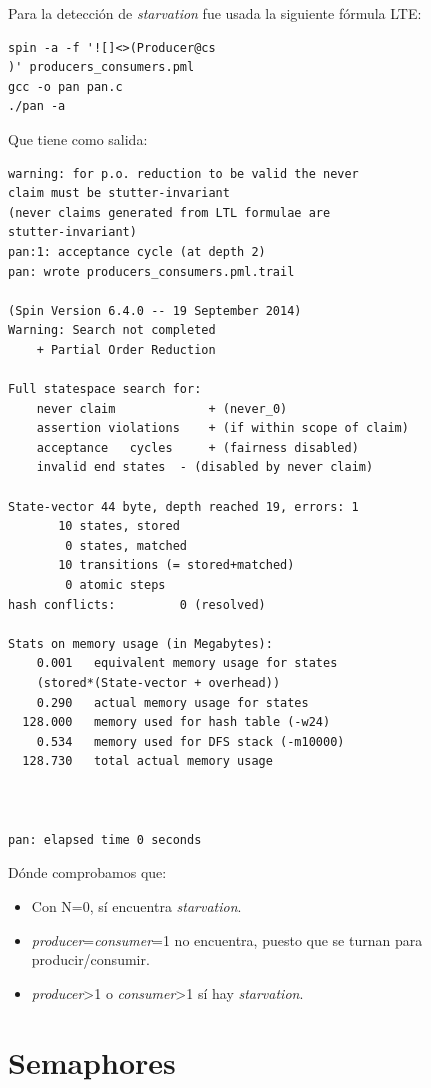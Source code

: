 \documentclass[a4paper,12pt]{article}
\begin{document}
Para la detección de \textit{starvation} fue usada la siguiente fórmula LTE: 

\begin{lstlisting}[frame=single]
spin -a -f '![]<>(Producer@cs
)' producers_consumers.pml
gcc -o pan pan.c
./pan -a
\end{lstlisting}
 
Que tiene como salida:

\begin{lstlisting}[frame=single]
warning: for p.o. reduction to be valid the never 
claim must be stutter-invariant
(never claims generated from LTL formulae are 
stutter-invariant)
pan:1: acceptance cycle (at depth 2)
pan: wrote producers_consumers.pml.trail

(Spin Version 6.4.0 -- 19 September 2014)
Warning: Search not completed
	+ Partial Order Reduction

Full statespace search for:
	never claim         	+ (never_0)
	assertion violations	+ (if within scope of claim)
	acceptance   cycles 	+ (fairness disabled)
	invalid end states	- (disabled by never claim)

State-vector 44 byte, depth reached 19, errors: 1
       10 states, stored
        0 states, matched
       10 transitions (= stored+matched)
        0 atomic steps
hash conflicts:         0 (resolved)

Stats on memory usage (in Megabytes):
    0.001	equivalent memory usage for states 
    (stored*(State-vector + overhead))
    0.290	actual memory usage for states
  128.000	memory used for hash table (-w24)
    0.534	memory used for DFS stack (-m10000)
  128.730	total actual memory usage



pan: elapsed time 0 seconds

\end{lstlisting}
Dónde comprobamos que:

\begin{itemize}
\item Con N=0, sí encuentra \textit{starvation}.
\item \textit{producer}=\textit{consumer}=1 no encuentra, puesto que se turnan para producir/consumir.
\item \textit{producer}\textgreater 1 o \textit{consumer}\textgreater 1 sí hay \textit{starvation}.
\end{itemize}


\newpage
\section{Semaphores}
\end{document}
